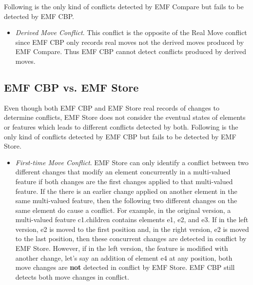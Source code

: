 Following is the only kind of conflicts detected by EMF Compare but fails to be detected by EMF CBP. 
\begin{itemize}
  \item \emph{Derived Move Conflict}. This conflict is the opposite of the Real Move conflict since EMF CBP only records real moves not the derived moves produced by EMF Compare. Thus EMF CBP cannot detect conflicts produced by derived moves.
\end{itemize}

\subsection{EMF CBP vs. EMF Store}
\label{sec:emf_cbp_vs_emf_store}
Even though both EMF CBP and EMF Store real records of changes to determine conflicts, EMF Store does not consider the eventual states of elements or features which leads to different conflicts detected by both. Following is the only kind of conflicts detected by EMF CBP but fails to be detected by EMF Store. 
\begin{itemize}
  \item \emph{First-time Move Conflict}. EMF Store can only identify a conflict between two different changes that modify an element concurrently in a multi-valued feature if both changes are the first changes applied to that multi-valued feature. If the there is an earlier change applied on another element in the same multi-valued feature, then the following two different changes on the same element do cause a conflict. For example, in the original version, a multi-valued feature \textsf{c1}.\textsf{children} contains elements \textsf{e1}, \textsf{e2}, and \textsf{e3}. If in the left version, \textsf{e2} is moved to the first position and, in the right version, \textsf{e2} is moved to the last position, then these concurrent changes are detected in conflict by EMF Store. However, if in the left version, the feature is modified with another change, let's say an addition of element \textsf{e4} at any position, both \textsf{move} changes are \textbf{not} detected in conflict by EMF Store. EMF CBP still detects both \textsf{move} changes in conflict.
\end{itemize}


